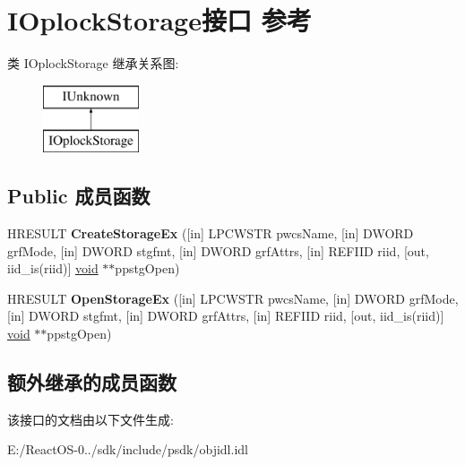 \hypertarget{interface_i_oplock_storage}{}\section{I\+Oplock\+Storage接口 参考}
\label{interface_i_oplock_storage}
类 I\+Oplock\+Storage 继承关系图\+:\begin{figure}[H]
\begin{center}
\leavevmode
\includegraphics[height=2.000000cm]{interface_i_oplock_storage}
\end{center}
\end{figure}
\subsection*{Public 成员函数}
\begin{DoxyCompactItemize}
\item 
\mbox{\label{interface_i_oplock_storage_aa5b73f39e13984475cdade606cdf45f4}} 
H\+R\+E\+S\+U\+LT {\bfseries Create\+Storage\+Ex} (\mbox{[}in\mbox{]} L\+P\+C\+W\+S\+TR pwcs\+Name, \mbox{[}in\mbox{]} D\+W\+O\+RD grf\+Mode, \mbox{[}in\mbox{]} D\+W\+O\+RD stgfmt, \mbox{[}in\mbox{]} D\+W\+O\+RD grf\+Attrs, \mbox{[}in\mbox{]} R\+E\+F\+I\+ID riid, \mbox{[}out, iid\+\_\+is(riid)\mbox{]} \hyperlink{interfacevoid}{void} $\ast$$\ast$ppstg\+Open)
\item 
\mbox{\label{interface_i_oplock_storage_ab8fb31a115e0ef02ec1c43d3a18de78a}} 
H\+R\+E\+S\+U\+LT {\bfseries Open\+Storage\+Ex} (\mbox{[}in\mbox{]} L\+P\+C\+W\+S\+TR pwcs\+Name, \mbox{[}in\mbox{]} D\+W\+O\+RD grf\+Mode, \mbox{[}in\mbox{]} D\+W\+O\+RD stgfmt, \mbox{[}in\mbox{]} D\+W\+O\+RD grf\+Attrs, \mbox{[}in\mbox{]} R\+E\+F\+I\+ID riid, \mbox{[}out, iid\+\_\+is(riid)\mbox{]} \hyperlink{interfacevoid}{void} $\ast$$\ast$ppstg\+Open)
\end{DoxyCompactItemize}
\subsection*{额外继承的成员函数}


该接口的文档由以下文件生成\+:\begin{DoxyCompactItemize}
\item 
E\+:/\+React\+O\+S-\/0../sdk/include/psdk/objidl.\+idl\end{DoxyCompactItemize}

